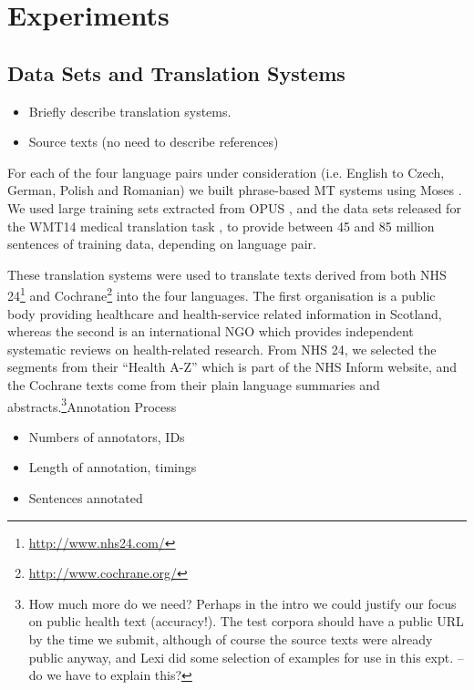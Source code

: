 \documentclass[11pt]{article}
\newcommand{\bh}[2]{\footnote{\color{blue} #1}}
\begin{document}
\section{Experiments}\label{sec:experiments}
\subsection{Data Sets and Translation Systems}
\begin{itemize}
  \item Briefly describe translation systems.
  \item Source texts (no need to describe references)
\end{itemize}

For each of the four language pairs under consideration (i.e. English to 
Czech, German, Polish and Romanian) we built phrase-based MT systems
using Moses \cite{Koehn:2007}. We used large training sets extracted from OPUS \cite{tiedemann:2009}, and
the data sets released for the WMT14 medical translation task \cite{bojar-EtAl:2014:W14-33}, to provide between
45 and 85 million sentences of training data, depending on language pair.

These translation systems were used to translate texts derived from both NHS 24\footnote{\url{http://www.nhs24.com/}} and 
Cochrane\footnote{\url{http://www.cochrane.org/}} into the four languages. The first organisation is a public body
providing healthcare and health-service related information in Scotland, whereas the second is an international NGO which 
provides independent systematic reviews on health-related research. From NHS 24, we selected the segments from their
``Health A-Z'' which is part of the NHS Inform website, and the Cochrane texts come from their plain language summaries
and abstracts.\bh{How much more do we need? Perhaps in the intro we could justify our focus on public health text
(accuracy!). The test corpora should have a public URL by the time we submit, although of course the source texts were 
already public anyway, and Lexi did some selection of examples for use in this expt. -- do we have to explain this?}

\subsection{Annotation Process}
\begin{itemize}
  \item Numbers of annotators, IDs
  \item Length of annotation, timings
  \item Sentences annotated
\end{itemize}
\end{document}
